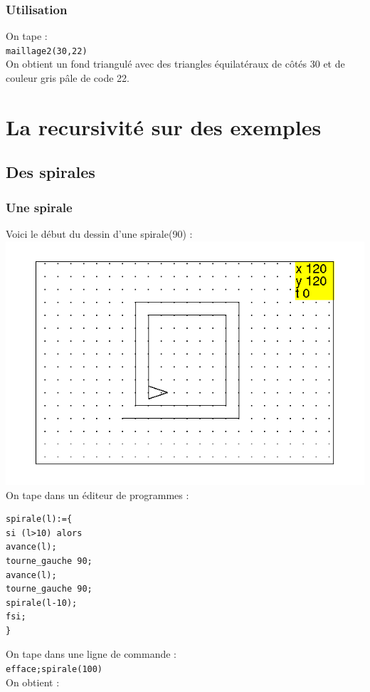 \documentclass[a4paper,11pt]{book}
\begin{document}
\subsection{Utilisation}
On tape :\\
{\tt maillage2(30,22)}\\
On obtient un fond triangul\'e avec des triangles \'equilat\'eraux de c\^ot\'es
30 et de couleur gris p\^ale de code 22.

\chapter{La recursivit\'e sur des exemples}
\section{Des spirales}
\subsection{Une spirale}
Voici le d\'ebut du dessin d'une spirale(90) :\\
%
\includegraphics[width=\textwidth]{tortspi}\\
On tape dans un \'editeur de programmes :
\begin{verbatim}
spirale(l):={
si (l>10) alors 
avance(l);
tourne_gauche 90;
avance(l);
tourne_gauche 90;
spirale(l-10);
fsi;
}
\end{verbatim}
On tape dans une ligne de commande :\\
{\tt efface;spirale(100)}\\
On obtient :\\
\end{document}
